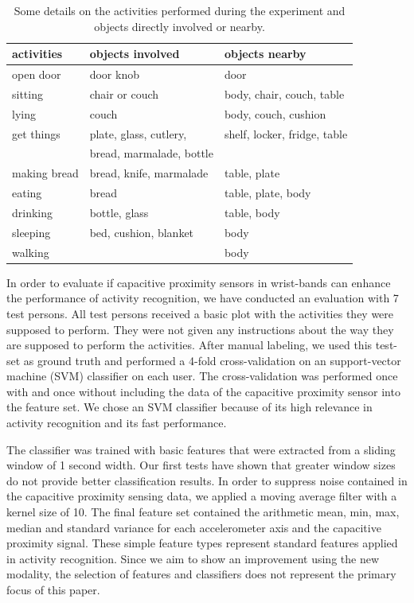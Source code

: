 \documentclass[runningheads,a4paper]{llncs}
\begin{document}
\begin{table}
	\centering
	\caption{Some details on the activities performed during the experiment and objects directly involved or nearby.}
	\setlength{\tabcolsep}{12pt}
	\begin{tabular}{lll}
		\toprule
		activities		& objects involved			& objects nearby			\\ 
		\midrule
		open door		& door knob 				& door  					\\
		sitting			& chair or couch			& body, chair, couch, table	\\
		lying			& couch						& body, couch, cushion		\\
		get things		& plate, glass, cutlery, 	& shelf, locker, fridge, table \\ 
						& bread, marmalade, bottle  & 							\\
		making bread	& bread, knife, marmalade	& table, plate 				\\
		eating			& bread						& table, plate, body		\\
		drinking 		& bottle, glass 			& table, body				\\
		sleeping		& bed, cushion, blanket		& body 						\\
		walking			& 							& body						\\
		 \bottomrule
	\end{tabular}
	\label{tab:activities}
\end{table}

In order to evaluate if capacitive proximity sensors in wrist-bands can enhance the performance of activity recognition, we have conducted an evaluation with 7 test persons. All test persons received a basic plot with the activities they were supposed to perform. They were not given any instructions about the way they are supposed to perform the activities. After manual labeling, we used this test-set as ground truth and performed a 4-fold cross-validation on an support-vector machine (SVM) classifier on each user. The cross-validation was performed once with and once without including the data of the capacitive proximity sensor into the feature set. We chose an SVM classifier because of its high relevance in activity recognition and its fast performance. 

The classifier was trained with basic features that were extracted from a sliding window of 1 second width. Our first tests have shown that greater window sizes do not provide better classification results. In order to suppress noise contained in the capacitive proximity sensing data, we applied a moving average filter with a kernel size of 10. The final feature set contained the arithmetic mean, min, max, median and standard variance for each accelerometer axis and the capacitive proximity signal. These simple feature types represent standard features applied in activity recognition. Since we aim to show an improvement using the new modality, the selection of features and classifiers does not represent the primary focus of this paper. 
\end{document}
